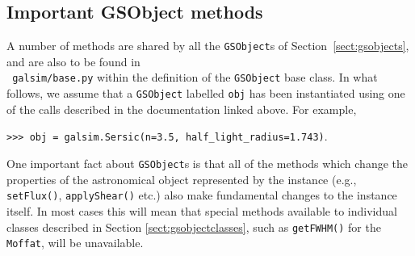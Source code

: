 \documentclass[preprint,11pt]{aastex}
\begin{document}
\subsection{Important GSObject methods}\label{sect:gsobjectmethods}
A number of methods are shared by all the \texttt{GSObject}s of
Section~\ref{sect:gsobjects}, and are also to be found in \\ {\tt
 galsim/base.py} within the definition of the
\texttt{GSObject} base class.  In what follows, we assume that a
\texttt{GSObject} labelled \texttt{obj} has been instantiated using
one of the calls described in the documentation linked above.  For
example,

{\tt >>> obj = galsim.Sersic(n=3.5, half\_light\_radius=1.743)}.

One important fact about \texttt{GSObject}s is that all of the
methods which change the properties of the astronomical object
represented by the instance (e.g., \texttt{setFlux()},
  \texttt{applyShear()} etc.) also make fundamental changes to the
  instance itself.  In most cases this will mean that special methods
  available to individual classes described in Section
  \ref{sect:gsobjectclasses}, such as \texttt{getFWHM()} for the
  \texttt{Moffat}, will be unavailable.
\end{document}
